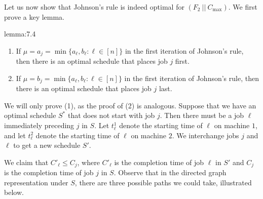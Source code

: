 Let us now show that Johnson's rule is indeed optimal for 
$(F_2~||~C_{\max})$. We first prove a key lemma. 

\begin{lemma}{lemma:7.4}
    \begin{enumerate}[(1)]
        \item If $\mu = a_j = \min\{a_\ell, b_\ell : \ell \in [n]\}$ in the 
        first iteration of Johnson's rule, then there is an optimal schedule 
        that places job $j$ first. 
        \item If $\mu = b_j = \min\{a_\ell, b_\ell : \ell \in [n]\}$ in the 
        first iteration of Johnson's rule, then there is an optimal schedule 
        that places job $j$ last. 
    \end{enumerate}
\end{lemma}
\begin{pf}
    We will only prove (1), as the proof of (2) is analogous. 
    Suppose that we have an optimal schedule $S^*$ that does not start with 
    job $j$. Then there must be a job $\ell$ immediately preceding $j$ in 
    $S$. Let $t_\ell^1$ denote the starting time of $\ell$ on machine $1$, 
    and let $t_\ell^2$ denote the starting time of $\ell$ on machine $2$. 
    We interchange jobs $j$ and $\ell$ to get a new schedule $S'$. 

    We claim that $C'_\ell \leq C_j$, where $C'_\ell$ is the completion time 
    of job $\ell$ in $S'$ and $C_j$ is the completion time of job $j$ in $S$. 
    Observe that in the directed graph representation under $S$, 
    there are three possible paths we could take, illustrated below. 
    \begin{center}
\end{center}
\end{pf}
